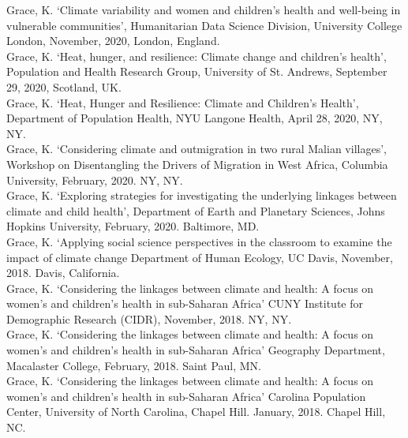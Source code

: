 \documentclass[11pt]{article} %
\begin{document}
\noindent
Grace, K. ‘Climate variability and women and children’s health and well-being in vulnerable communities’, Humanitarian Data Science Division, University College London, November, 2020, London, England.\\

\noindent
Grace, K. `Heat, hunger, and resilience: Climate change and children's health', Population and Health Research Group, University of St. Andrews, September 29, 2020, Scotland, UK.\\

\noindent
Grace, K. `Heat, Hunger and Resilience: Climate and Children's Health', Department of Population Health, NYU Langone Health, April 28, 2020, NY, NY.\\

\noindent
Grace, K. `Considering climate and outmigration in two rural Malian villages', Workshop on Disentangling the Drivers of Migration in West Africa, Columbia University, February, 2020. NY, NY.\\

\noindent
Grace, K. `Exploring strategies for investigating the underlying linkages between climate and child health', Department of Earth and Planetary Sciences, Johns Hopkins University, February, 2020. Baltimore, MD.\\

\noindent
Grace, K. `Applying social science perspectives in the classroom to examine the impact of climate change  Department of Human Ecology, UC Davis, November, 2018. Davis, California.\\


\noindent
Grace, K. `Considering the linkages between climate and health: A focus on women's and children's health in sub-Saharan Africa' CUNY Institute for Demographic Research (CIDR), November, 2018. NY, NY. \\


\noindent
Grace, K. `Considering the linkages between climate and health: A focus on women's and children's health in sub-Saharan Africa' Geography Department, Macalaster College, February, 2018. Saint Paul, MN. \\

\noindent
Grace, K. `Considering the linkages between climate and health: A focus on women's and children's health in sub-Saharan Africa' Carolina Population Center, University of North Carolina, Chapel Hill.  January, 2018. Chapel Hill, NC.\\
\end{document}
